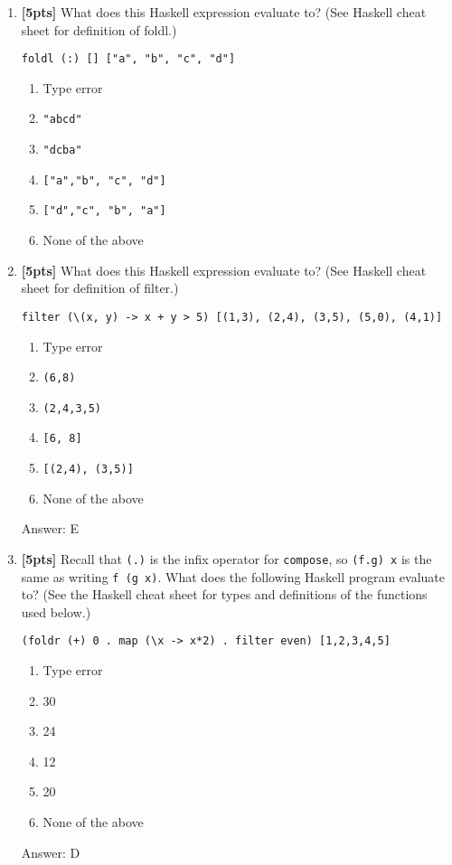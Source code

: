 \documentclass[paper=letter, fontsize=13pt]{article} %
\numberwithin{equation}{section} %
\newif\ifshowanswers\showanswerstrue
\begin{document}
\begin{enumerate}
\item \textbf{[5pts]}  What does this Haskell expression evaluate to?
  (See Haskell cheat sheet for definition of foldl.)
\begin{lstlisting}
foldl (:) [] ["a", "b", "c", "d"]
\end{lstlisting}
  \begin{enumerate}
    \item Type error
    \item \verb|"abcd"|
    \item \verb|"dcba"|
    \item \verb|["a","b", "c", "d"]|
    \item \verb|["d","c", "b", "a"]|
    \item None of the above
  \end{enumerate}

\item \textbf{[5pts]}  What does this Haskell expression evaluate to?
  (See Haskell cheat sheet for definition of filter.)
\begin{lstlisting}
filter (\(x, y) -> x + y > 5) [(1,3), (2,4), (3,5), (5,0), (4,1)]
\end{lstlisting}
  \begin{enumerate}
    \item Type error
    \item \verb|(6,8)|
    \item \verb|(2,4,3,5)|
    \item \verb|[6, 8]|
    \item \verb|[(2,4), (3,5)]|
    \item None of the above
  \end{enumerate}
\ifshowanswers
Answer: E
\fi

\item \textbf{[5pts]} 
Recall that \texttt{(.)} is the infix operator for \texttt{compose}, so \texttt{(f.g) x} is the same as writing \texttt{f (g x)}. 
What does the following Haskell program evaluate to? (See the Haskell cheat sheet for types and definitions 
of the functions used below.)
\begin{lstlisting}
(foldr (+) 0 . map (\x -> x*2) . filter even) [1,2,3,4,5]
\end{lstlisting}
  \begin{enumerate}
    \item Type error
    \item 30
    \item 24
    \item 12
    \item 20
    \item None of the above
  \end{enumerate}
\ifshowanswers
Answer: D
\fi
  

\end{enumerate}
\end{document}

